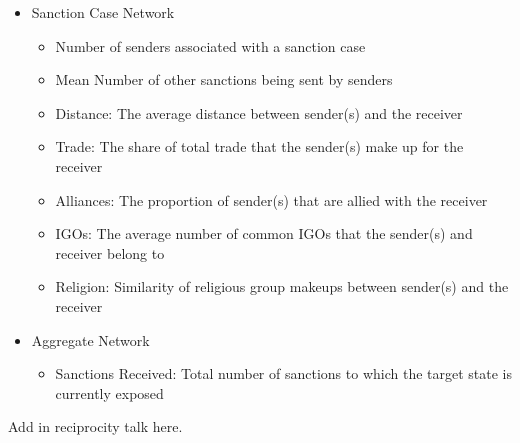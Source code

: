 \begin{itemize}
	\item Sanction Case Network
	\begin{itemize}
		\item Number of senders associated with a sanction case
		\item Mean Number of other sanctions being sent by senders
		\item Distance: The average distance between sender(s) and the receiver
		\item Trade: The share of total trade that the sender(s) make up for the receiver		
		\item Alliances: The proportion of sender(s) that are allied with the receiver
		\item IGOs: The average number of common IGOs that the sender(s) and receiver belong to
		\item Religion: Similarity of religious group makeups between sender(s) and the receiver
	\end{itemize}
	\item Aggregate Network
	\begin{itemize}
		\item Sanctions Received: Total number of sanctions to which the target state is currently exposed
	\end{itemize}
\end{itemize}

Add in reciprocity talk here. 
